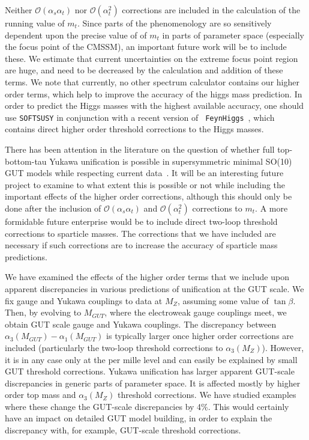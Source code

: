 \documentclass[final,3p,times,pdflatex]{elsarticle}
\begin{document}
 Neither $\mathcal O(\alpha_s \alpha_t) $ nor $\mathcal O(\alpha_t^2)$
 corrections are included in the calculation of the running value of
 $m_t$. Since parts of the phenomenology are so 
 sensitively dependent upon the precise value of of $m_t$ in parts of
 parameter space (especially the focus point of the CMSSM), an important
 future work will be to include these. We estimate that current uncertainties
 on the extreme focus point region are huge, and need to be decreased by the
 calculation and addition of these terms. 
 We note that currently, no other spectrum calculator contains our higher
 order terms, which help to improve the accuracy of the higgs mass
 prediction. 
 In order to predict the Higgs masses with the highest available accuracy, one
 should use {\tt SOFTSUSY} in conjunction with a recent version of {\tt
   FeynHiggs}~\cite{Borowka:2014wla}, which contains direct higher order threshold corrections to the
 Higgs masses. 

 There has been attention in the literature 
 on the question of whether full top-bottom-tau Yukawa
 unification is possible in supersymmetric minimal SO(10) GUT
 models while respecting current
 data~\cite{Blazek:2002ta,Altmannshofer:2008vr,Anandakrishnan:2014nea}.  
 It will be an interesting future project to examine to what extent this is
 possible or not while including the important effects of the higher order
 corrections, although this should only be done after the inclusion of
 $\mathcal O(\alpha_s \alpha_t) $ and $\mathcal O(\alpha_t^2)$ corrections to
 $m_t$. 
 A more formidable future enterprise would
 be to  include direct two-loop threshold corrections to sparticle masses. The
 corrections that we have included are necessary if such corrections are to
 increase the accuracy of sparticle mass predictions.  

 We have examined the effects of the higher order terms that we include
 upon apparent discrepancies in various predictions of unification at the GUT
 scale. We fix gauge and Yukawa couplings to data at $M_Z$, assuming some
 value of $\tan \beta$. Then, by evolving to $M_{GUT}$, where the electroweak
 gauge couplings meet, we obtain GUT scale gauge and Yukawa couplings. The
 discrepancy between $\alpha_3(M_{GUT})-\alpha_1(M_{GUT})$ is typically larger 
 once higher order corrections are included (particularly the two-loop
 threshold corrections to $\alpha_3(M_Z)$). However, it is in any case only at
 the per mille level and can easily be explained by small GUT threshold
 corrections. Yukawa unification has larger apparent GUT-scale discrepancies in
 generic parts of parameter space. It is affected mostly by higher order top
 mass and $\alpha_3(M_Z)$ threshold corrections. We have studied examples
 where these change the GUT-scale
 discrepancies by 4$\%$. This would certainly have an impact on detailed GUT
 model building, in order to explain the discrepancy with, for example,
 GUT-scale  threshold corrections. 
 
\end{document}

